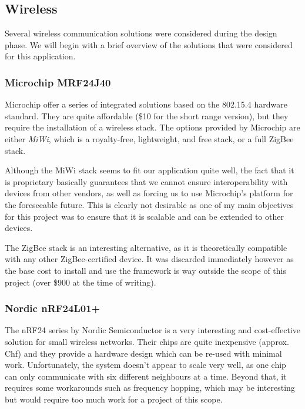 \subsection{Wireless}
\label{sub:wireless}

Several wireless communication solutions were considered during the design
phase. We will begin with a brief overview of the solutions that were considered
for this application.

\subsubsection{Microchip MRF24J40}

Microchip offer a series of integrated solutions
based on the 802.15.4
hardware standard. They are quite affordable (\$10 for the short range version),
but they require the installation of a wireless stack. The options provided by
Microchip are either \emph{MiWi}, which is a royalty-free, lightweight, and free
stack, or a full ZigBee stack.

Although the MiWi stack seems to fit our application quite well, the fact that
it is proprietary basically guarantees that we cannot ensure interoperability
with devices from other vendors, as well as forcing us to use Microchip's
platform for the foreseeable future. This is clearly not desirable as one of my
main objectives for this project was to ensure that it is scalable and can be
extended to other devices.

The ZigBee stack is an interesting alternative, as it is theoretically
compatible with any other ZigBee-certified device. It was discarded immediately
however as the base cost to install and use the framework is way outside the
scope of this project (over \$900 at the time of writing).

\subsubsection{Nordic nRF24L01+}

The nRF24 series by Nordic Semiconductor is a
very interesting and cost-effective solution for small wireless networks. Their
chips are quite inexpensive (approx. \unit[7]{Chf}) and they provide a hardware
design which can be re-used with minimal work. Unfortunately, the system doesn't
appear to scale very well, as one chip can only communicate with six different
neighbours at a time. Beyond that, it requires some workarounds such as
frequency hopping, which may be interesting but would require too much work for
a project of this scope.

